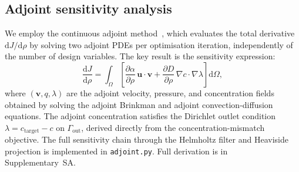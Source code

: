 \subsection{Adjoint sensitivity analysis}
\label{sec:adjoint}
We employ the continuous adjoint method~\cite{borrvall2003,lazarov2016},
which evaluates the total derivative $\mathrm{d}J/\mathrm{d}\rho$
by solving two adjoint PDEs per optimisation iteration,
independently of the number of design variables.
The key result is the sensitivity expression:
\begin{equation}
    \frac{\mathrm{d}J}{\mathrm{d}\rho} = \int_\Omega
        \left[ \frac{\partial\alpha}{\partial\rho}\,\mathbf{u}\cdot\mathbf{v}
             + \frac{\partial D}{\partial\rho}\,\nabla c\cdot\nabla\lambda \right]
    \mathrm{d}\Omega,
    \label{eq:sensitivity}
\end{equation}
where $(\mathbf{v},q,\lambda)$ are the adjoint velocity, pressure,
and concentration fields obtained by solving the adjoint Brinkman
and adjoint convection-diffusion equations.
The adjoint concentration satisfies the Dirichlet outlet condition
$\lambda = c_{\text{target}} - c$ on $\Gamma_{\text{out}}$,
derived directly from the concentration-mismatch objective.
The full sensitivity chain through the Helmholtz filter and
Heaviside projection is implemented in \texttt{adjoint.py}.
Full derivation is in Supplementary~SA.

